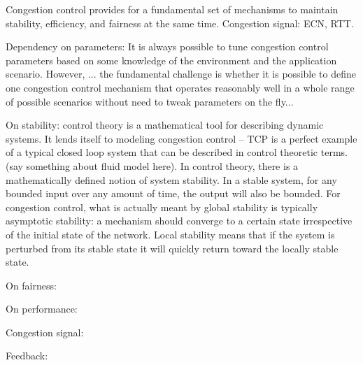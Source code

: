 Congestion control provides for a fundamental set of mechanisms to maintain stability, efficiency, and fairness at the same time. Congestion signal: ECN, RTT.

Dependency on parameters: It is always possible to tune congestion control parameters based on some knowledge of the environment and the application scenario. However, ... the fundamental challenge is whether it is possible to define one congestion control mechanism that operates reasonably well in a whole range of possible scenarios without need to tweak parameters on the fly...


On stability: control theory is a mathematical tool for describing dynamic systems. It lends itself to modeling congestion control -- TCP is a perfect example of a typical closed loop system that can be described in control theoretic terms. (say something about fluid model here). In control theory, there is a mathematically defined notion of system stability.  In a stable system, for any bounded input over any amount of time, the output will also be bounded.  For congestion control, what is actually meant by global  stability is typically asymptotic stability: a mechanism should converge to a certain state irrespective of the initial state of the network. Local stability means that if the system is perturbed from its stable state it will quickly return toward the locally stable state.


On fairness: 


On performance:

Congestion signal:

Feedback:



